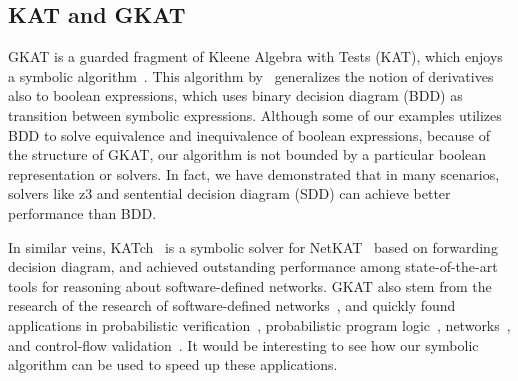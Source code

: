 \documentclass[conference]{IEEEtran}
\begin{document}
\subsection{KAT and GKAT}

GKAT is a guarded fragment of Kleene Algebra with Tests (KAT), which enjoys a symbolic algorithm~\cite{pous_SymbolicAlgorithmsLanguage_2015}.
This algorithm by~\citeauthor{pous_SymbolicAlgorithmsLanguage_2015} generalizes the notion of derivatives also to boolean expressions, which uses binary decision diagram (BDD) as transition between symbolic expressions.
Although some of our examples utilizes BDD to solve equivalence and inequivalence of boolean expressions, because of the structure of GKAT, our algorithm is not bounded by a particular boolean representation or solvers.
In fact, we have demonstrated that in many scenarios, solvers like z3 and sentential decision diagram (SDD) can achieve better performance than BDD.

In similar veins, KATch~\cite{moeller_KATchFastSymbolic_2024} is a symbolic solver for NetKAT~\cite{anderson_NetKATSemanticFoundations_2014} based on forwarding decision diagram, and achieved outstanding performance among state-of-the-art tools for reasoning about software-defined networks.
GKAT also stem from the research of the research of software-defined networks~\cite{smolka_ScalableVerificationProbabilistic_2019,smolka_GuardedKleeneAlgebra_2020}, and quickly found applications in probabilistic verification~\cite{ro.zowski_ProbabilisticGuardedKAT_2023}, probabilistic program logic~\cite{gomes_KleeneAlgebraTests_2024}, networks~\cite{wasserstein_GUARDEDNETKATSOUNDNESS_2023}, and control-flow validation~\cite{zhang_CFGKATEfficientValidation_2025}.
It would be interesting to see how our symbolic algorithm can be used to speed up these applications.




\printbibliography

\newpage
\appendix
\end{document}
